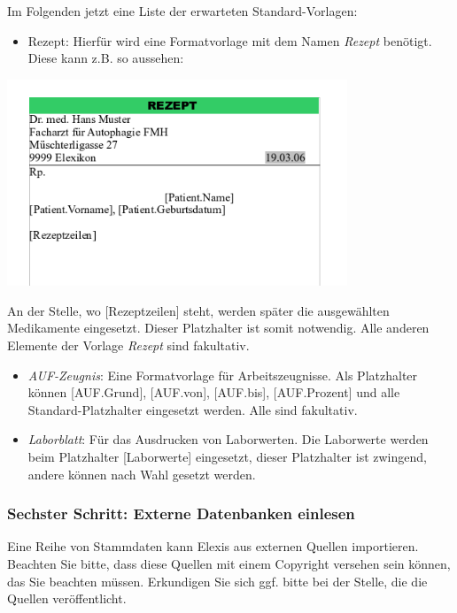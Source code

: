 Im Folgenden jetzt eine Liste der erwarteten Standard-Vorlagen:

\begin{itemize}
\item Rezept: Hierfür wird eine Formatvorlage mit dem Namen \textit{Rezept} benötigt. Diese kann z.B. so aussehen:
 \end{itemize}
\includegraphics[width=4in]{images/rezept.png}

An der Stelle, wo [Rezeptzeilen] steht, werden später die ausgewählten Medikamente eingesetzt. Dieser Platzhalter ist somit notwendig. Alle anderen Elemente der Vorlage \textit{Rezept} sind fakultativ.

\begin{itemize}
 \item \textit{AUF-Zeugnis}: Eine Formatvorlage für Arbeitszeugnisse. Als Platzhalter können [AUF.Grund], [AUF.von], [AUF.bis], [AUF.Prozent] und alle Standard-Platzhalter eingesetzt werden. Alle sind fakultativ.


 \item \textit{Laborblatt}: Für das Ausdrucken von Laborwerten. Die Laborwerte werden beim Platzhalter [Laborwerte] eingesetzt, dieser Platzhalter ist zwingend, andere können nach Wahl gesetzt werden.
\end{itemize}

\subsubsection{Sechster Schritt: Externe Datenbanken einlesen}

Eine Reihe von Stammdaten kann Elexis aus externen Quellen importieren. Beachten Sie bitte, dass diese Quellen mit einem Copyright versehen sein können, das Sie beachten müssen. Erkundigen Sie sich ggf. bitte bei der Stelle, die die Quellen veröffentlicht.

